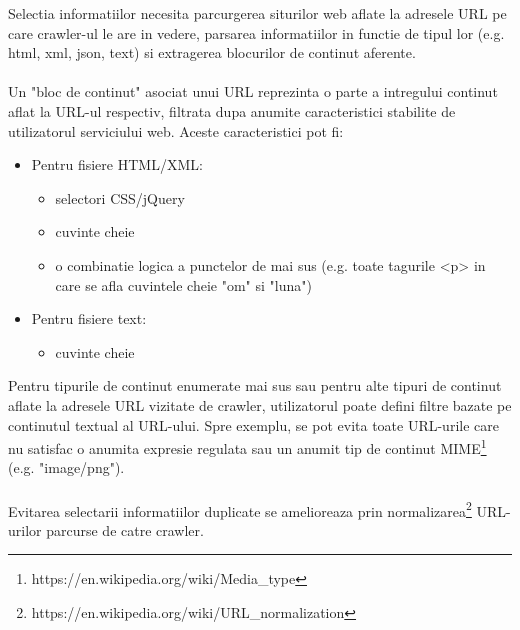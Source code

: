 Selectia informatiilor necesita parcurgerea siturilor web aflate la adresele URL pe care crawler-ul le are in vedere, parsarea informatiilor in functie de tipul lor (e.g. html, xml, json, text) si extragerea blocurilor de continut aferente.
\\
\\
Un "bloc de continut" asociat unui URL reprezinta o parte a intregului continut aflat la URL-ul respectiv, filtrata dupa anumite caracteristici stabilite de utilizatorul serviciului web. Aceste caracteristici pot fi:

\begin{itemize}
	\item{Pentru fisiere HTML/XML:
		\begin{itemize}
			\item{selectori CSS/jQuery}
			\item{cuvinte cheie}
			\item{o combinatie logica a punctelor de mai sus (e.g. toate tagurile \textless{}p\textgreater{ }  in care se afla cuvintele cheie "om" si "luna")}
		\end{itemize}			
	}
	\item{Pentru fisiere text:
		\begin{itemize}
			\item{cuvinte cheie}
		\end{itemize}			
	}
\end{itemize}

\noindent
Pentru tipurile de continut enumerate mai sus sau pentru alte tipuri de continut aflate la adresele URL vizitate de crawler, utilizatorul poate defini filtre bazate pe continutul textual al URL-ului. Spre exemplu, se pot evita toate URL-urile care nu satisfac o anumita expresie regulata sau un anumit tip de continut  MIME\footnote{https://en.wikipedia.org/wiki/Media\_type} (e.g. "image/png"). 
\\
\\
Evitarea selectarii informatiilor duplicate se amelioreaza prin normalizarea\footnote{https://en.wikipedia.org/wiki/URL\_normalization} URL-urilor parcurse de catre crawler.
